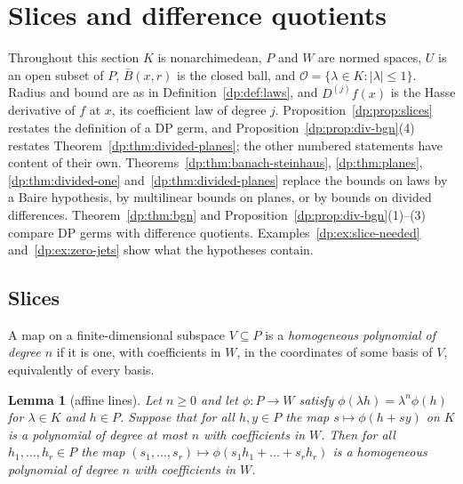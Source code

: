 \documentclass[11pt]{amsart}
\newtheorem{lemma}[theorem]{Lemma}
\theoremstyle{definition}
\theoremstyle{remark}
\numberwithin{equation}{section}
\newcommand{\abs}[1]{\lvert #1\rvert}
\theoremstyle{plain}
\theoremstyle{definition}
\theoremstyle{plain}
\begin{document}
\section{Slices and difference quotients}\label{dp:sec:quotients}

Throughout this section $K$ is nonarchimedean, $P$ and $W$ are normed spaces, $U$ is an open subset of $P$, $\bar B(x,r)$ is the closed ball, and $\mathcal O=\{\lambda\in K:\abs\lambda\le1\}$. Radius and bound are as in Definition~\ref{dp:def:laws}, and $D^{(j)}f(x)$ is the Hasse derivative of $f$ at $x$, its coefficient law of degree $j$. Proposition~\ref{dp:prop:slices} restates the definition of a DP germ, and Proposition~\ref{dp:prop:div-bgn}(4) restates Theorem~\ref{dp:thm:divided-planes}; the other numbered statements have content of their own. Theorems~\ref{dp:thm:banach-steinhaus}, \ref{dp:thm:planes}, \ref{dp:thm:divided-one} and~\ref{dp:thm:divided-planes} replace the bounds on laws by a Baire hypothesis, by multilinear bounds on planes, or by bounds on divided differences. Theorem~\ref{dp:thm:bgn} and Proposition~\ref{dp:prop:div-bgn}(1)--(3) compare DP germs with difference quotients. Examples~\ref{dp:ex:slice-needed} and~\ref{dp:ex:zero-jets} show what the hypotheses contain.

\subsection{Slices}\label{dp:sq:ssec-slices}

A map on a finite-dimensional subspace $V\subseteq P$ is a \emph{homogeneous polynomial of degree $n$} if it is one, with coefficients in $W$, in the coordinates of some basis of $V$, equivalently of every basis.

\begin{lemma}[affine lines]\label{dp:sq:lines}
Let $n\ge0$ and let $\phi\colon P\to W$ satisfy $\phi(\lambda h)=\lambda^n\phi(h)$ for $\lambda\in K$ and $h\in P$. Suppose that for all $h,y\in P$ the map $s\mapsto\phi(h+sy)$ on $K$ is a polynomial of degree at most $n$ with coefficients in $W$. Then for all $h_1,\dots,h_r\in P$ the map $(s_1,\dots,s_r)\mapsto\phi(s_1h_1+\dots+s_rh_r)$ is a homogeneous polynomial of degree $n$ with coefficients in $W$.
\end{lemma}
\end{document}
